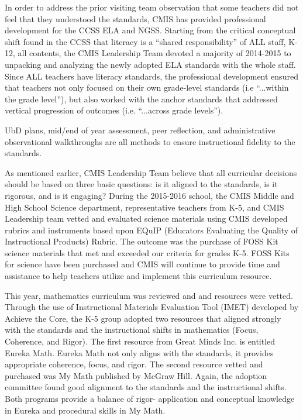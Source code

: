 \documentclass{report}
\begin{document}
\begin{findings}
In order to address the prior visiting team observation that some teachers did not feel that they understood the standards, CMIS has provided professional development for the CCSS ELA  and NGSS. Starting from the critical conceptual shift found in the CCSS that literacy is a “shared responsibility” of ALL staff, K-12, all contents, the CMIS Leadership Team devoted a majority of 2014-2015 to unpacking and analyzing the newly adopted ELA standards with the whole staff.  Since ALL teachers have literacy standards, the professional development ensured that teachers not only focused on their own grade-level standards (i.e “...within the grade level”), but also worked with the anchor standards that addressed vertical progression of outcomes (i.e. “...across grade levels”). 

UbD plans, mid/end of year assessment, peer reflection, and administrative observational walkthroughs are all methods to ensure instructional fidelity to the standards. 

As mentioned earlier, CMIS Leadership Team believe that all curricular decisions should be based on three basic questions: is it aligned to the standards, is it rigorous, and is it engaging? During the 2015-2016 school, the CMIS Middle and High School Science department, representative teachers from K-5, and CMIS Leadership team vetted and evaluated science materials using CMIS developed rubrics and instruments based upon EQuIP (Educators Evaluating the Quality of Instructional Products) Rubric. The outcome was the purchase of FOSS Kit science materials that met and exceeded our criteria for grades K-5. FOSS Kits for science have been purchased and CMIS will continue to provide time and assistance to help teachers utilize and implement this curriculum resource. 

This year, mathematics curriculum was reviewed and and resources were vetted. Through the use of Instructional Materials Evaluation Tool (IMET) developed by Achieve the Core, the K-5 group adopted two resources that aligned strongly with the standards and the instructional shifts in mathematics (Focus, Coherence, and Rigor). The first resource from Great Minds Inc. is entitled Eureka Math. Eureka Math not only aligns with the standards, it provides appropriate coherence, focus, and rigor. The second resource vetted and purchased was My Math published by McGraw Hill. Again, the adoption committee  found good alignment to the standards and the instructional shifts. Both programs provide a balance of rigor- application and conceptual knowledge in Eureka and procedural skills in My Math. 


\end{findings}
\end{document}
